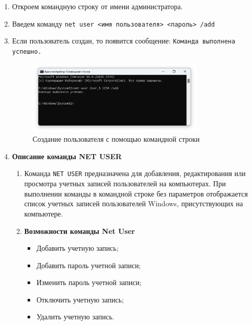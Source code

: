 \documentclass[a4paper, 14pt]{report}
\begin{document}
\begin{enumerate}
    \item {Откроем командную строку от имени администратора.}
    \item {Введем команду \texttt{net user <имя пользователя> <пароль> /add}}
    \item {Если пользователь создан, то появится сообщение: \texttt{Команда выполнена успешно.}
          \begin{figure}[H]
              \centering
              \includegraphics[width=0.8\textwidth]{../images/cmd_create_user.png}
              \caption{Создание пользователя с помощью командной строки}
          \end{figure}
          }
    \item \textbf{Описание команды NET USER}
          \begin{enumerate}
              \item Команда \texttt{NET USER} предназначена для добавления, редактирования или просмотра учетных записей пользователей на компьютерах. При выполнении команды в командной строке без параметров отображается список учетных записей пользователей Windows, присутствующих на компьютере.
              \item \textbf{Возможности команды Net User}
                    \begin{itemize}
                        \item Добавить учетную запись;
                        \item Добавить пароль учетной записи;
                        \item Изменить пароль учетной записи;
                        \item Отключить учетную запись;
                        \item Удалить учетную запись.
                    \end{itemize}
          \end{enumerate}
\end{enumerate}
\end{document}
